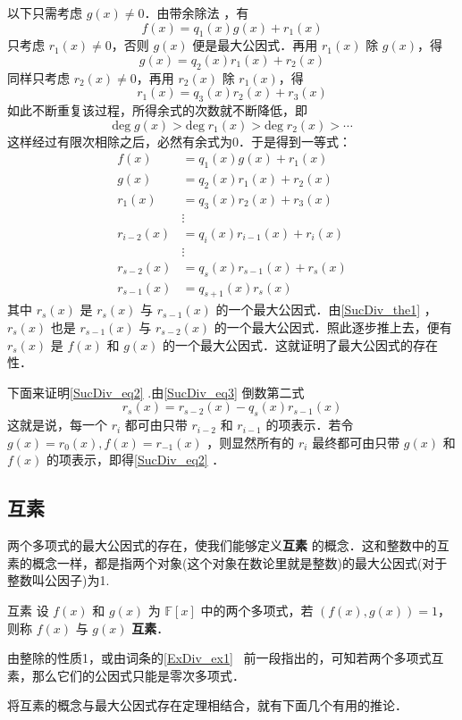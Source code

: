 以下只需考虑 $g(x)\neq 0$．由带余除法 ，有
\begin{equation}
f(x)=q_1(x)g(x)+r_1(x)
\end{equation}
只考虑 $r_1(x)\neq 0$，否则 $g(x)$ 便是最大公因式．再用 $r_1(x)$ 除 $g(x)$，得
\begin{equation}
g(x)=q_2(x)r_1(x)+r_2(x)
\end{equation}
同样只考虑 $r_2(x)\neq0$，再用 $r_2(x)$ 除 $r_1(x)$，得
\begin{equation}
r_1(x)=q_3(x)r_2(x)+r_3(x)
\end{equation}
如此不断重复该过程，所得余式的次数就不断降低，即
\begin{equation}
\mathrm{deg}\;g(x)>\mathrm{deg}\;r_1(x)>\mathrm{deg}\;r_2(x)>\cdots
\end{equation}
这样经过有限次相除之后，必然有余式为0．于是得到一等式：
\begin{equation}\label{SucDiv_eq3}
\begin{aligned}
f(x)&=q_1(x)g(x)+r_1(x)\\
g(x)&=q_2(x)r_1(x)+r_2(x)\\
r_1(x)&=q_3(x)r_2(x)+r_3(x)\\
&\vdots\\
r_{i-2}(x)&=q_i(x)r_{i-1}(x)+r_i(x)\\
&\vdots\\
r_{s-2}(x)&=q_s(x)r_{s-1}(x)+r_s(x)\\
r_{s-1}(x)&=q_{s+1}(x)r_s(x)
\end{aligned}
\end{equation}
其中 $r_s(x)$ 是 $r_s(x)$ 与 $r_{s-1}(x)$ 的一个最大公因式．由\autoref{SucDiv_the1} ，$r_s(x)$ 也是 $r_{s-1}(x)$ 与 $r_{s-2}(x)$ 的一个最大公因式．照此逐步推上去，便有 $r_s(x)$ 是 $f(x)$ 和 $g(x)$ 的一个最大公因式．这就证明了最大公因式的存在性．

下面来证明\autoref{SucDiv_eq2} .由\autoref{SucDiv_eq3} 倒数第二式
\begin{equation}
r_s(x)=r_{s-2}(x)-q_s(x)r_{s-1}(x)
\end{equation}
这就是说，每一个 $r_i$ 都可由只带 $r_{i-2}$ 和 $r_{i-1}$ 的项表示．若令 $g(x)=r_0(x),f(x)=r_{-1}(x)$ ，则显然所有的 $r_i$ 最终都可由只带 $g(x)$ 和 $f(x)$ 的项表示，即得\autoref{SucDiv_eq2} ．
\subsection{互素}
两个多项式的最大公因式的存在，使我们能够定义\textbf{互素} 的概念．这和整数中的互素的概念一样，都是指两个对象(这个对象在数论里就是整数)的最大公因式(对于整数叫公因子)为1.
\begin{definition}{互素}
设 $f(x)$ 和 $g(x)$ 为 $\mathbb{F}[x]$ 中的两个多项式，若 $(f(x),g(x))=1$，则称 $f(x)$ 与 $g(x)$ \textbf{互素}．
\end{definition}
由整除的性质1，或由词条的\autoref{ExDiv_ex1}~ 前一段指出的，可知若两个多项式互素，那么它们的公因式只能是零次多项式．

将互素的概念与最大公因式存在定理相结合，就有下面几个有用的推论．
\begin{theorem}{}

\end{theorem}